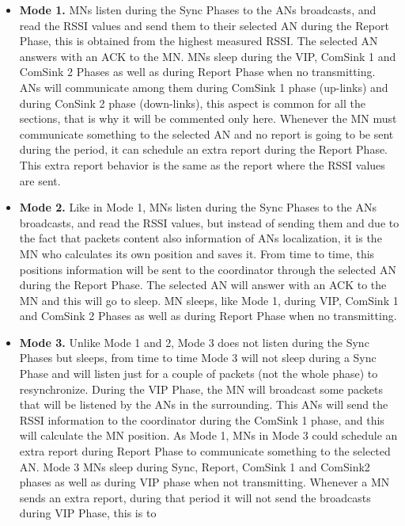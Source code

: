 \begin{itemize}
 \item \textbf{Mode 1.} \acp{MN} listen during the Sync Phases to the \acp{AN} broadcasts, and read the \ac{RSSI} values and send them
to their selected \ac{AN} during the Report Phase, this is obtained from the highest measured \ac{RSSI}. The selected \ac{AN} answers with an \ac{ACK} 
to the \ac{MN}. \acp{MN} sleep during the \ac{VIP}, ComSink 1 and ComSink 2 Phases as well as during Report Phase when no transmitting. 
\acp{AN} will communicate among them during ComSink 1 phase (up-links) and during ConSink 2 phase (down-links), this aspect is common for all the 
sections, that is why it will be commented only here. Whenever the \ac{MN} must communicate something to the selected \ac{AN} and no report is going to 
be sent during the period, it can schedule an extra report during the Report Phase. This extra report behavior is the same as the report where
the \ac{RSSI} values are sent.
 \item \textbf{Mode 2.} Like in Mode 1, \acp{MN} listen during the Sync Phases to the \acp{AN} broadcasts, and read the \ac{RSSI} values, but instead
of sending them and due to the fact that packets content also information of \acp{AN} localization, it is the \ac{MN} who calculates its own position 
and saves it. From time to time, this positions information will be sent to the 
coordinator through the selected \ac{AN} during the Report Phase. The selected \ac{AN} will answer with an \ac{ACK} to the \ac{MN} and this will go to
sleep. \ac{MN} sleeps, like Mode 1, during \ac{VIP}, ComSink 1 and ComSink 2 Phases as well as during Report Phase when no transmitting.
 \item \textbf{Mode 3.} Unlike Mode 1 and 2, Mode 3 does not listen during the Sync Phases but sleeps, from time to time Mode 3 will not sleep during a 
Sync Phase and will listen just for a couple of packets (not the whole phase) to resynchronize. During the \ac{VIP} Phase, the \ac{MN} will broadcast
some packets that will be listened by the \acp{AN} in the surrounding. This \acp{AN} will send the \ac{RSSI} information to the coordinator during the 
ComSink 1 phase, and this will calculate the \ac{MN} position. As Mode 1, \acp{MN} in Mode 3 could schedule an extra report during Report Phase to
communicate something to the selected \ac{AN}. Mode 3 \acp{MN} sleep during Sync, Report, ComSink 1 and ComSink2 phases as well as during \ac{VIP} phase
when not transmitting. Whenever a \ac{MN} sends an extra report, during that period it will not send the broadcasts during \ac{VIP} Phase, this is to 

\end{itemize}
